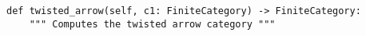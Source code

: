 \begin{verbatim}
def twisted_arrow(self, c1: FiniteCategory) -> FiniteCategory:
    """ Computes the twisted arrow category """
\end{verbatim}